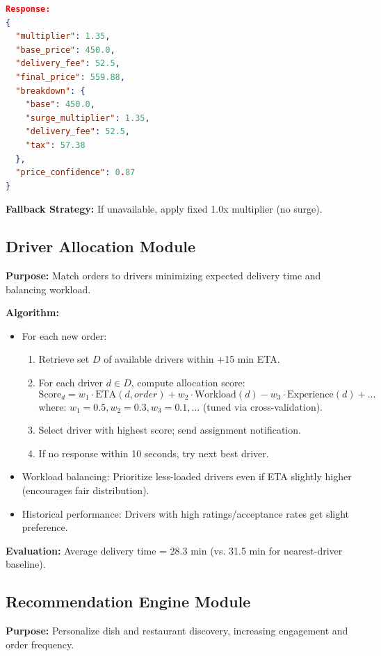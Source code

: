 \documentclass[12pt,a4paper]{report}
\begin{document}
\begin{itemize}
\begin{lstlisting}[language=json, caption={Dynamic Pricing Endpoint}]
Response:
{
  "multiplier": 1.35,
  "base_price": 450.0,
  "delivery_fee": 52.5,
  "final_price": 559.88,
  "breakdown": {
    "base": 450.0,
    "surge_multiplier": 1.35,
    "delivery_fee": 52.5,
    "tax": 57.38
  },
  "price_confidence": 0.87
}
\end{lstlisting}

\textbf{Fallback Strategy:} If unavailable, apply fixed 1.0x multiplier (no surge).

\subsection{Driver Allocation Module}

\textbf{Purpose:} Match orders to drivers minimizing expected delivery time and balancing workload.

\textbf{Algorithm:}
\begin{itemize}
    \item For each new order:
    \begin{enumerate}
        \item Retrieve set $D$ of available drivers within +15 min ETA.
        \item For each driver $d \in D$, compute allocation score:
        $$\text{Score}_d = w_1 \cdot \text{ETA}(d, order) + w_2 \cdot \text{Workload}(d) - w_3 \cdot \text{Experience}(d) + ...$$
        where: $w_1 = 0.5, w_2 = 0.3, w_3 = 0.1, ...$ (tuned via cross-validation).
        \item Select driver with highest score; send assignment notification.
        \item If no response within 10 seconds, try next best driver.
    \end{enumerate}
    \item Workload balancing: Prioritize less-loaded drivers even if ETA slightly higher (encourages fair distribution).
    \item Historical performance: Drivers with high ratings/acceptance rates get slight preference.
\end{itemize}

\textbf{Evaluation:} Average delivery time = 28.3 min (vs. 31.5 min for nearest-driver baseline).

\subsection{Recommendation Engine Module}

\textbf{Purpose:} Personalize dish and restaurant discovery, increasing engagement and order frequency.


\end{itemize}
\end{document}
